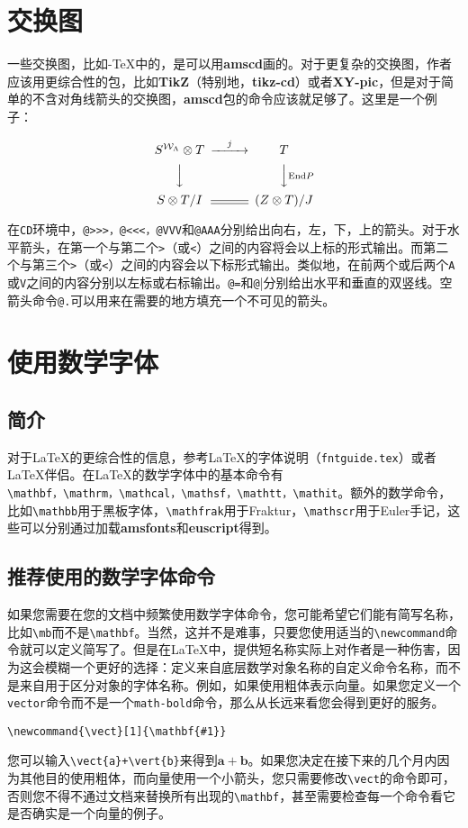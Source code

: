 \documentclass[openany]{ctexbook}
\begin{document}
\chapter{交换图}
一些交换图，比如\AmS-\TeX 中的，是可以用{\bfseries amscd}画的。对于更复杂的交换图，作者应该用更综合性的包，比如{\bfseries TikZ}（特别地，{\bfseries tikz-cd}）或者{\bfseries XY-pic}，但是对于简单的不含对角线箭头的交换图，{\bfseries amscd}包的命令应该就足够了。这里是一个例子：
\begin{tcblisting}{}
\[
\begin{CD}
S^{\mathcal{W}_\Lambda}\otimes T @>j>>  T\\
@VVV                                    @VV{\text{End} P}V\\
{S\otimes T}/I                  @=      (Z\otimes T)/J
\end{CD}
\]
\end{tcblisting}

在\verb|CD|环境中，\verb|@>>>，@<<<，@VVV|和\verb|@AAA|分别给出向右，左，下，上的箭头。对于水平箭头，在第一个与第二个\verb|>|（或\verb|<|）之间的内容将会以上标的形式输出。而第二个与第三个\verb|>|（或\verb|<|）之间的内容会以下标形式输出。类似地，在前两个或后两个\verb|A|或\verb|V|之间的内容分别以左标或右标输出。\verb|@=|和\verb|@||分别给出水平和垂直的双竖线。空箭头命令\verb|@.|可以用来在需要的地方填充一个不可见的箭头。
\chapter{使用数学字体}
\section{简介}
对于\LaTeX 的更综合性的信息，参考\LaTeX 的字体说明（\verb|fntguide.tex|）或者\LaTeX 伴侣\cite{4}。在\LaTeX 的数学字体中的基本命令有\\\verb|\mathbf，\mathrm，\mathcal，\mathsf，\mathtt，\mathit|。额外的数学命令，比如\verb|\mathbb|用于黑板字体，\verb|\mathfrak|用于Fraktur，\verb|\mathscr|用于Euler手记，这些可以分别通过加载{\bfseries amsfonts}和{\bfseries euscript}得到。
\section{推荐使用的数学字体命令}
如果您需要在您的文档中频繁使用数学字体命令，您可能希望它们能有简写名称，比如\verb|\mb|而不是\verb|\mathbf|。当然，这并不是难事，只要您使用适当的\verb|\newcommand|命令就可以定义简写了。但是在\LaTeX 中，提供短名称实际上对作者是一种伤害，因为这会模糊一个更好的选择：定义来自底层数学对象名称的自定义命令名称，而不是来自用于区分对象的字体名称。例如，如果使用粗体表示向量。如果您定义一个\verb|vector|命令而不是一个\verb|math-bold|命令，那么从长远来看您会得到更好的服务。
\begin{verbatim}
\newcommand{\vect}[1]{\mathbf{#1}}
\end{verbatim}
您可以输入\verb|\vect{a}+\vert{b}|来得到$\mathbf a+\mathbf b$。如果您决定在接下来的几个月内因为其他目的使用粗体，而向量使用一个小箭头，您只需要修改\verb|\vect|的命令即可，否则您不得不通过文档来替换所有出现的\verb|\mathbf|，甚至需要检查每一个命令看它是否确实是一个向量的例子。
\end{document}
